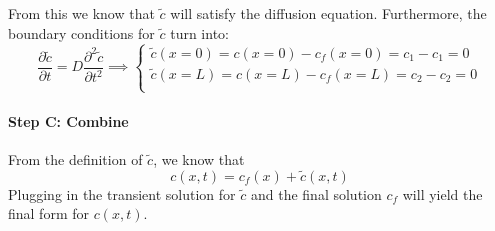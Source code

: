 From this we know that $\tilde c$ will satisfy the diffusion equation. Furthermore, the boundary conditions for $\tilde c$ turn into:
\begin{equation*}
	\frac{\partial \tilde c}{\partial t} = D\frac{\partial ^2 \tilde c}{\partial t^2}\implies\begin{cases}
		\tilde c(x=0) = c(x=0)-c_f(x=0)=c_1-c_1=0\\
		\tilde c(x=L) = c(x=L)-c_f(x=L)=c_2-c_2=0\\
	\end{cases}
\end{equation*}

\paragraph{Step C: Combine}
From the definition of $\tilde c$, we know that 
\begin{equation*}
	c(x,t) = c_f(x) + \tilde c(x,t)
\end{equation*}
Plugging in the transient solution for $\tilde c$ and the final solution $c_f$ will yield the final form for $c(x,t)$.

\setcounter{chapter}{3}
\renewcommand{\thechapter}{\arabic{chapter}}


